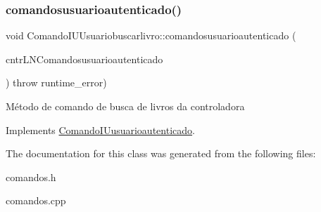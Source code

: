 \subsubsection{\texorpdfstring{comandosusuarioautenticado()}{comandosusuarioautenticado()}}
{\footnotesize\ttfamily void Comando\+I\+U\+Usuariobuscarlivro\+::comandosusuarioautenticado (\begin{DoxyParamCaption}\item[{\hyperlink{classILNComandosusuarioautenticado}{I\+L\+N\+Comandosusuarioautenticado} $\ast$}]{cntr\+L\+N\+Comandosusuarioautenticado }\end{DoxyParamCaption}) throw  runtime\+\_\+error) \hspace{0.3cm}{\ttfamily [virtual]}}

Método de comando de busca de livros da controladora 

Implements \hyperlink{classComandoIUusuarioautenticado}{Comando\+I\+Uusuarioautenticado}.



The documentation for this class was generated from the following files\+:\begin{DoxyCompactItemize}
\item 
comandos.\+h\item 
comandos.\+cpp\end{DoxyCompactItemize}
